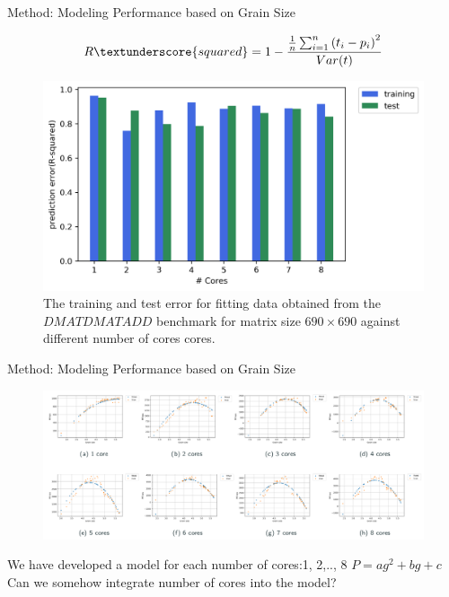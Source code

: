 \documentclass[10pt]{beamer}
\begin{document}
\begin{frame}{Method: Modeling Performance based on Grain Size}
	\begin{outline}	
		$$R\textunderscore{squared} = 1-\frac{{\frac{1}{n}\sum_{i=1}^{n}{(t_i-p_i)}^2}}{Var(t)}$$
		\begin{figure}[H]
			\centering
			\includegraphics[scale=.5]{images/polyfit/error_690_r2.png}
			\caption{The training and test error for fitting data obtained from the $DMATDMATADD$ benchmark for matrix size $690\times690$ against different number of cores cores.}	
			\label{fig33}
		\end{figure}
	\end{outline}
\end{frame}

\begin{frame}{Method: Modeling Performance based on Grain Size}
	\begin{outline}	
		\begin{figure}
		\includegraphics[scale=.15]{images/polyfit/model_1_8.png}
		\end{figure}

		\1We have developed a model for each number of cores:1, 2,.., 8 $P=ag^2+bg+c$\\ 
		\pause
		\1Can we somehow integrate number of cores into the model?
	\end{outline}
\end{frame}
\end{document}
